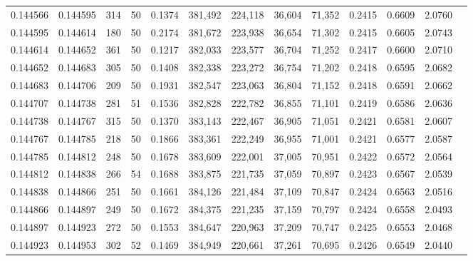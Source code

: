 \begin{tabular}{rrrrrrrrrrrrr}
0.144566 & 0.144595 &   314 &  50 &                                     0.1374 & 381,492 & 224,118 &  36,604 &  71,352 & 0.2415 & 0.6609 & 2.0760 \\
0.144595 & 0.144614 &   180 &  50 &                                     0.2174 & 381,672 & 223,938 &  36,654 &  71,302 & 0.2415 & 0.6605 & 2.0743 \\
0.144614 & 0.144652 &   361 &  50 &                                     0.1217 & 382,033 & 223,577 &  36,704 &  71,252 & 0.2417 & 0.6600 & 2.0710 \\
0.144652 & 0.144683 &   305 &  50 &                                     0.1408 & 382,338 & 223,272 &  36,754 &  71,202 & 0.2418 & 0.6595 & 2.0682 \\
0.144683 & 0.144706 &   209 &  50 &                                     0.1931 & 382,547 & 223,063 &  36,804 &  71,152 & 0.2418 & 0.6591 & 2.0662 \\
0.144707 & 0.144738 &   281 &  51 &                                     0.1536 & 382,828 & 222,782 &  36,855 &  71,101 & 0.2419 & 0.6586 & 2.0636 \\
0.144738 & 0.144767 &   315 &  50 &                                     0.1370 & 383,143 & 222,467 &  36,905 &  71,051 & 0.2421 & 0.6581 & 2.0607 \\
0.144767 & 0.144785 &   218 &  50 &                                     0.1866 & 383,361 & 222,249 &  36,955 &  71,001 & 0.2421 & 0.6577 & 2.0587 \\
0.144785 & 0.144812 &   248 &  50 &                                     0.1678 & 383,609 & 222,001 &  37,005 &  70,951 & 0.2422 & 0.6572 & 2.0564 \\
0.144812 & 0.144838 &   266 &  54 &                                     0.1688 & 383,875 & 221,735 &  37,059 &  70,897 & 0.2423 & 0.6567 & 2.0539 \\
0.144838 & 0.144866 &   251 &  50 &                                     0.1661 & 384,126 & 221,484 &  37,109 &  70,847 & 0.2424 & 0.6563 & 2.0516 \\
0.144866 & 0.144897 &   249 &  50 &                                     0.1672 & 384,375 & 221,235 &  37,159 &  70,797 & 0.2424 & 0.6558 & 2.0493 \\
0.144897 & 0.144923 &   272 &  50 &                                     0.1553 & 384,647 & 220,963 &  37,209 &  70,747 & 0.2425 & 0.6553 & 2.0468 \\
0.144923 & 0.144953 &   302 &  52 &                                     0.1469 & 384,949 & 220,661 &  37,261 &  70,695 & 0.2426 & 0.6549 & 2.0440 \\

\end{tabular}
